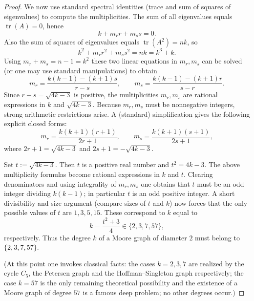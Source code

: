 \documentclass[10pt,a4paper]{amsart}
\begin{document}
\begin{proof}
We now use standard spectral identities (trace and sum of squares of
eigenvalues) to compute the multiplicities. The sum of all eigenvalues
equals \(\operatorname{tr}(A)=0\), hence
\[
k + m_r r + m_s s = 0.
\]
Also the sum of squares of eigenvalues equals \(\operatorname{tr}(A^2)=nk\),
so
\[
k^2 + m_r r^2 + m_s s^2 = nk = k^3 + k.
\]
Using \(m_r+m_s = n-1 = k^2\) these two linear equations in \(m_r,m_s\)
can be solved (or one may use standard manipulations) to obtain
\[
m_r = \frac{k(k-1) - (k+1)s}{r-s},\qquad
m_s = \frac{k(k-1) - (k+1)r}{s-r}.
\]
Since \(r-s = \sqrt{4k-3}\) is positive, the multiplicities \(m_r,m_s\)
are rational expressions in \(k\) and \(\sqrt{4k-3}\). Because
\(m_r,m_s\) must be nonnegative integers, strong arithmetic restrictions
arise. A (standard) simplification gives the following explicit closed
forms:
\[
m_r = \frac{k(k+1)(r+1)}{2r+1},\qquad
m_s = \frac{k(k+1)(s+1)}{2s+1},
\]
where \(2r+1=\sqrt{4k-3}\) and \(2s+1=-\sqrt{4k-3}\).

Set \(t := \sqrt{4k-3}\). Then \(t\) is a positive real number and
\(t^2 = 4k-3\). The above multiplicity formulas become rational
expressions in \(k\) and \(t\). Clearing denominators and using
integrality of \(m_r,m_s\) one obtains that \(t\) must be an odd integer
dividing \(k(k-1)\); in particular \(t\) is an odd positive integer. A
short divisibility and size argument (compare sizes of \(t\) and \(k\))
now forces that the only possible values of \(t\) are \(1,3,5,15\).
These correspond to \(k\) equal to
\[
k = \frac{t^2+3}{4} \in \{2,3,7,57\},
\]
respectively. Thus the degree \(k\) of a Moore graph of diameter \(2\)
must belong to \(\{2,3,7,57\}\).

(At this point one invokes classical facts: the cases \(k=2,3,7\) are
realized by the cycle \(C_5\), the Petersen graph and the
Hoffman--Singleton graph respectively; the case \(k=57\) is the only
remaining theoretical possibility and the existence of a Moore graph of
degree \(57\) is a famous deep problem; no other degrees occur.)
\end{proof}
\end{document}
